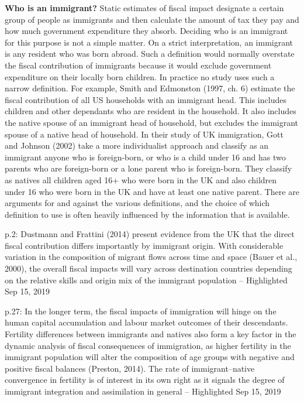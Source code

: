 \textbf{Who is an immigrant?}
Static estimates of fiscal impact designate a certain group of people as immigrants and then calculate the amount of tax they pay and how much government expenditure they absorb. Deciding who is an immigrant for this purpose is not a simple matter. On a strict interpretation, an immigrant is any resident who was born abroad. Such a definition would normally overstate the fiscal contribution of immigrants because it would exclude government expenditure on their locally born children. In practice no study uses such a narrow definition. For example, Smith and Edmonston (1997, ch. 6) estimate the fiscal contribution of all US households with an immigrant head. This includes children and other dependants who are resident in the household. It also includes the native spouse of an immigrant head of household, but excludes the immigrant spouse of a native head of household. In their study of UK immigration, Gott and Johnson (2002) take a more individualist approach and classify as an immigrant anyone who is foreign-born, or who is a child under 16 and has two parents who are foreign-born or a lone parent who is foreign-born. They classify as natives all children aged 16+ who were born in the UK and also children under 16 who were born in the UK and have at least one native parent. There are arguments for and against the various definitions, and the choice of which definition to use is often heavily influenced by the information that is available. \citep{Rowthorn:kk}



\citep{Bratsberg:2014cl}
p.2: Dustmann and Frattini (2014) present evidence from the UK that the direct fiscal contribution differs importantly by immigrant origin. With considerable variation in the composition of migrant flows across time and space (Bauer et al., 2000), the overall fiscal impacts will vary across destination countries depending on the relative skills and origin mix of the immigrant population -- Highlighted Sep 15, 2019

p.27: In the longer term, the fiscal impacts of immigration will hinge on the human capital accumulation and labour market outcomes of their descendants. Fertility differences between immigrants and natives also form a key factor in the dynamic analysis of fiscal consequences of immigration, as higher fertility in the immigrant population will alter the composition of age groups with negative and positive fiscal balances (Preston, 2014). The rate of immigrant–native convergence in fertility is of interest in its own right as it signals the degree of immigrant integration and assimilation in general -- Highlighted Sep 15, 2019

